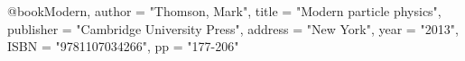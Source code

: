 
@book{Modern,
      author         = "Thomson, Mark",
      title          = "{Modern particle physics}",
      publisher      = "Cambridge University Press",
      address        = "New York",
      year           = "2013",
      ISBN           = "9781107034266",
      pp			 = "177-206"
}
